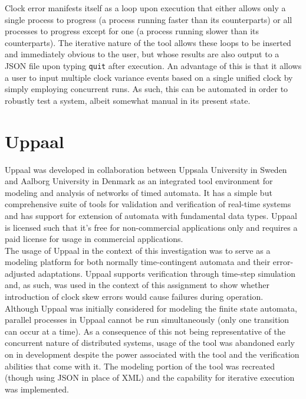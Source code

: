 \documentclass[12pt]{extarticle}
\begin{document}
Clock error manifests itself as a loop upon execution that either allows only a single process to progress (a process running faster than its counterparts) or all processes to progress except for one (a process running slower than its counterparts). The iterative nature of the tool allows these loops to be inserted and immediately obvious to the user, but whose results are also output to a JSON file upon typing \texttt{quit} after execution. An advantage of this is that it allows a user to input multiple clock variance events based on a single unified clock by simply employing concurrent runs. As such, this can be automated in order to robustly test a system, albeit somewhat manual in its present state.

\section{Uppaal}
Uppaal was developed in collaboration between Uppsala University in Sweden and Aalborg University in Denmark as an integrated tool environment for modeling and analysis of networks of timed automata. It has a simple but comprehensive suite of tools for validation and verification of real-time systems and has support for extension of automata with fundamental data types. Uppaal is licensed such that it’s free for non-commercial applications only and requires a paid license for usage in commercial applications.\\

The usage of Uppaal in the context of this investigation was to serve as a modeling platform for both normally time-contingent automata and their error-adjusted adaptations. Uppaal supports verification through time-step simulation and, as such, was used in the context of this assignment to show whether introduction of clock skew errors would cause failures during operation.\\

Although Uppaal was initially considered for modeling the finite state automata, parallel processes in Uppaal cannot be run simultaneously (only one transition can occur at a time). As a consequence of this not being representative of the concurrent nature of distributed systems, usage of the tool was abandoned early on in development despite the power associated with the tool and the verification abilities that come with it. The modeling portion of the tool was recreated (though using JSON in place of XML) and the capability for iterative execution was implemented.
\end{document}
